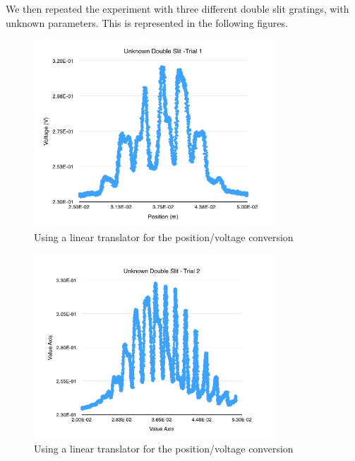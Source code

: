 \documentclass{article}
\begin{document}
We then repeated the experiment with three different double slit gratings, with
unknown parameters. This is represented in the following figures.

\begin{figure}[H]
    \centering
    \includegraphics[width=0.8\textwidth]{charts/unknown1}
    \caption{Using a linear translator for the position/voltage conversion}
    \label{unknown1}
\end{figure}

\begin{figure}[H]
    \centering
    \includegraphics[width=0.8\textwidth]{charts/unknown2}
    \caption{Using a linear translator for the position/voltage conversion}
    \label{unknown2}
\end{figure}
\end{document}

